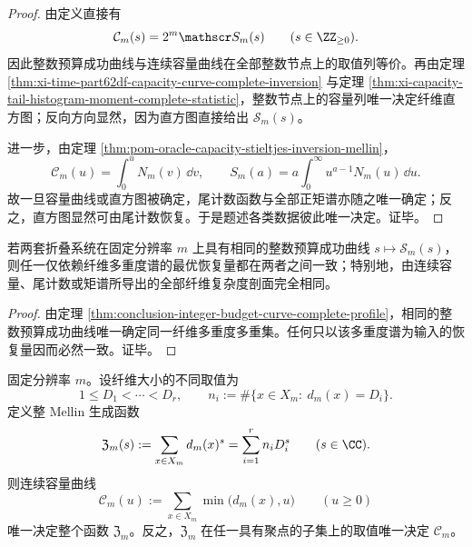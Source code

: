 \begin{proof}
由定义直接有
\[
\mathcal C_m(s)=2^m\mathscr S_m(s)
\qquad (s\in\ZZ_{\ge 0}).
\]
因此整数预算成功曲线与连续容量曲线在全部整数节点上的取值列等价。再由定理 \ref{thm:xi-time-part62df-capacity-curve-complete-inversion} 与定理 \ref{thm:xi-capacity-tail-histogram-moment-complete-statistic}，整数节点上的容量列唯一决定纤维直方图；反向方向显然，因为直方图直接给出 \(\mathscr S_m(s)\)。

进一步，由定理 \ref{thm:pom-oracle-capacity-stieltjes-inversion-mellin}，
\[
\mathcal C_m(u)=\int_0^u N_m(v)\,\dd v,
\qquad
S_m(a)=a\int_0^\infty u^{a-1}N_m(u)\,\dd u.
\]
故一旦容量曲线或直方图被确定，尾计数函数与全部正矩谱亦随之唯一确定；反之，直方图显然可由尾计数恢复。于是题述各类数据彼此唯一决定。证毕。
\end{proof}

\begin{corollary}[预算曲线的复杂度同型判据]\label{cor:conclusion-budget-curve-complexity-isomorphism}
若两套折叠系统在固定分辨率 \(m\) 上具有相同的整数预算成功曲线 \(s\mapsto \mathscr S_m(s)\)，则任一仅依赖纤维多重度谱的最优恢复量都在两者之间一致；特别地，由连续容量、尾计数或矩谱所导出的全部纤维复杂度剖面完全相同。
\end{corollary}

\begin{proof}
由定理 \ref{thm:conclusion-integer-budget-curve-complete-profile}，相同的整数预算成功曲线唯一确定同一纤维多重度多重集。任何只以该多重度谱为输入的恢复量因而必然一致。证毕。
\end{proof}

\begin{theorem}\label{thm:conclusion-capacity-entire-mellin-determinacy}
固定分辨率 \(m\)。设纤维大小的不同取值为
\[
1\le D_1<\cdots<D_r,
\qquad
n_i:=\#\{x\in X_m:\ d_m(x)=D_i\}.
\]
定义整 Mellin 生成函数
\[
\mathfrak Z_m(s)
:=
\sum_{x\in X_m}d_m(x)^s
=
\sum_{i=1}^{r} n_iD_i^s
\qquad (s\in\CC).
\]
则连续容量曲线
\[
\mathcal C_m(u):=\sum_{x\in X_m}\min\bigl(d_m(x),u\bigr)
\qquad (u\ge 0)
\]
唯一决定整个函数 \(\mathfrak Z_m\)。反之，\(\mathfrak Z_m\) 在任一具有聚点的子集上的取值唯一决定 \(\mathcal C_m\)。
\end{theorem}

